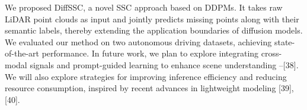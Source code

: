 \documentclass[conference]{IEEEtran}
\begin{document}
We proposed DiffSSC, a novel SSC approach based on DDPMs.
It takes raw LiDAR point clouds as input and jointly predicts missing points along with their semantic labels, thereby extending the application boundaries of diffusion models.
We evaluated our method on two autonomous driving datasets, achieving state-of-the-art performance.
In future work, we plan to explore integrating cross-modal signals and prompt-guided learning to enhance scene understanding \cite{lnunes2025}--[38].
We will also explore strategies for improving inference efficiency and reducing resource consumption, inspired by recent advances in lightweight modeling [39], [40].



\end{document}

